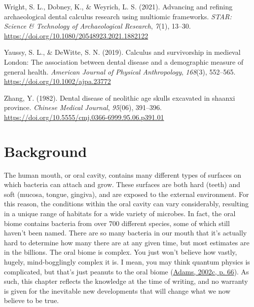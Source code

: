 \documentclass[
  letterpaper,
]{book}
\newlength{\cslhangindent}
\newlength{\cslentryspacingunit} %
\newenvironment{CSLReferences}[2] %
 {%
  \setlength{\parindent}{0pt}
  \ifodd #1
  \let\oldpar\par
  \def\par{\hangindent=\cslhangindent\oldpar}
  \fi
  \setlength{\parskip}{#2\cslentryspacingunit}
 }%
 {}
\begin{document}
\begin{CSLReferences}{1}{0}
\leavevmode{}%
Wright, S. L., Dobney, K., \& Weyrich, L. S. (2021). Advancing and
refining archaeological dental calculus research using multiomic
frameworks. \emph{STAR: Science \& Technology of Archaeological
Research}, \emph{7}(1), 13--30.
\url{https://doi.org/10.1080/20548923.2021.1882122}

\leavevmode{}%
Yaussy, S. L., \& DeWitte, S. N. (2019). Calculus and survivorship in
medieval {London}: {The} association between dental disease and a
demographic measure of general health. \emph{American Journal of
Physical Anthropology}, \emph{168}(3), 552--565.
\url{https://doi.org/10.1002/ajpa.23772}

\leavevmode{}%
Zhang, Y. (1982). Dental disease of neolithic age skulls excavated in
shaanxi province. \emph{Chinese Medical Journal}, \emph{95}(06),
391--396. \url{https://doi.org/10.5555/cmj.0366-6999.95.06.p391.01}

\end{CSLReferences}


\hypertarget{chap-background}{%
\chapter{Background}\label{chap-background}}

The human mouth, or oral cavity, contains many different types of
surfaces on which bacteria can attach and grow. These surfaces are both
hard (teeth) and soft (mucosa, tongue, gingiva), and are exposed to the
external environment. For this reason, the conditions within the oral
cavity can vary considerably, resulting in a unique range of habitats
for a wide variety of microbes. In fact, the oral biome contains
bacteria from over 700 different species, some of which still haven't
been named. There are so many bacteria in our mouth that it's actually
hard to determine how many there are at any given time, but most
estimates are in the billions. The oral biome is complex. You just won't
believe how vastly, hugely, mind-bogglingly complex it is. I mean, you
may think quantum physics is complicated, but that's just peanuts to the
oral biome (\protect\hyperlink{ref-adamsHitchhikersGuide2002}{Adams,
2002c, p. 66}). As such, this chapter reflects the knowledge at the time
of writing, and no warranty is given for the inevitable new developments
that will change what we now believe to be true.
\end{document}
